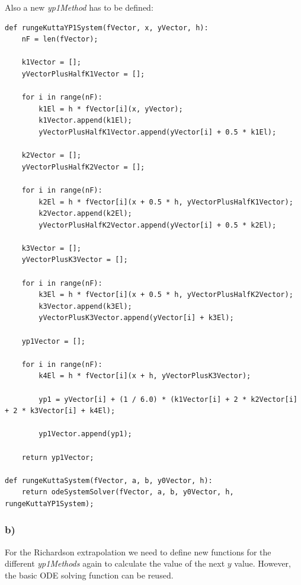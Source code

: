 Also a new \textit{yp1Method} has to be defined:

\begin{lstlisting}[caption=YP1Method for solving an ODE system]
def rungeKuttaYP1System(fVector, x, yVector, h):
	nF = len(fVector);
	
	k1Vector = [];
	yVectorPlusHalfK1Vector = [];
	
	for i in range(nF):
		k1El = h * fVector[i](x, yVector);
		k1Vector.append(k1El);
		yVectorPlusHalfK1Vector.append(yVector[i] + 0.5 * k1El);
	
	k2Vector = [];
	yVectorPlusHalfK2Vector = [];
	
	for i in range(nF):
		k2El = h * fVector[i](x + 0.5 * h, yVectorPlusHalfK1Vector);
		k2Vector.append(k2El);
		yVectorPlusHalfK2Vector.append(yVector[i] + 0.5 * k2El);
	
	k3Vector = [];
	yVectorPlusK3Vector = [];
	
	for i in range(nF):
		k3El = h * fVector[i](x + 0.5 * h, yVectorPlusHalfK2Vector);
		k3Vector.append(k3El);
		yVectorPlusK3Vector.append(yVector[i] + k3El);
	
	yp1Vector = [];
	
	for i in range(nF):
		k4El = h * fVector[i](x + h, yVectorPlusK3Vector);
		
		yp1 = yVector[i] + (1 / 6.0) * (k1Vector[i] + 2 * k2Vector[i] + 2 * k3Vector[i] + k4El);
		
		yp1Vector.append(yp1);
	
	return yp1Vector;

def rungeKuttaSystem(fVector, a, b, y0Vector, h):
	return odeSystemSolver(fVector, a, b, y0Vector, h, rungeKuttaYP1System);
\end{lstlisting}


\subsubsection{b)}

For the Richardson extrapolation we need to define new functions for the different \textit{yp1Methods} again to calculate the value of the next $y$ value. However, the basic ODE solving function can be reused.

